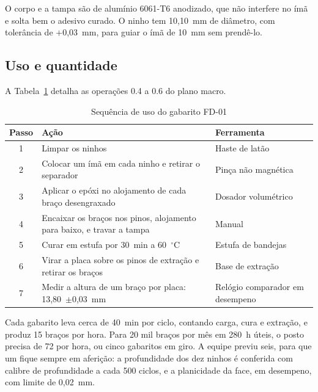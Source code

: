 O corpo e a tampa são de alumínio 6061-T6 anodizado, que não interfere no ímã e solta bem o adesivo curado. O ninho tem 10,10~mm de diâmetro, com tolerância de $+$0,03~mm, para guiar o ímã de 10~mm sem prendê-lo.

\subsection{Uso e quantidade}
\label{subsec:disp_uso}

A Tabela~\ref{tab:disp_uso} detalha as operações 0.4 a 0.6 do plano macro.

\begin{table}[htbp]
    \centering
    \caption{Sequência de uso do gabarito FD-01}
    \label{tab:disp_uso}
    \footnotesize
    \renewcommand{\arraystretch}{1.3}
    \begin{tabularx}{\textwidth}{@{}
        c
        >{\RaggedRight\arraybackslash}X
        >{\RaggedRight\arraybackslash}p{4.6cm}@{}}
        \toprule
        \textbf{Passo} & \textbf{Ação} & \textbf{Ferramenta} \\
        \midrule
        1 & Limpar os ninhos & Haste de latão \\
        2 & Colocar um ímã em cada ninho e retirar o separador & Pinça não magnética \\
        3 & Aplicar o epóxi no alojamento de cada braço desengraxado & Dosador volumétrico \\
        4 & Encaixar os braços nos pinos, alojamento para baixo, e travar a tampa & Manual \\
        5 & Curar em estufa por 30~min a 60~$^\circ$C & Estufa de bandejas \\
        6 & Virar a placa sobre os pinos de extração e retirar os braços & Base de extração \\
        7 & Medir a altura de um braço por placa: 13,80~$\pm$0,03~mm & Relógio comparador em desempeno \\
        \bottomrule
    \end{tabularx}
\end{table}

Cada gabarito leva cerca de 40~min por ciclo, contando carga, cura e extração, e produz 15 braços por hora. Para 20 mil braços por mês em 280~h úteis, o posto precisa de 72 por hora, ou cinco gabaritos em giro. A equipe previu seis, para que um fique sempre em aferição: a profundidade dos dez ninhos é conferida com calibre de profundidade a cada 500 ciclos, e a planicidade da face, em desempeno, com limite de 0,02~mm.
